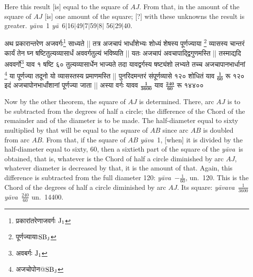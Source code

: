 \documentclass[11pt,a5paper]{book}
\def\ya{\textit{y\=a}}
\def\yava{\textit{y\=ava}}
\def\yavava{\textit{y\=avava}}
\def\danda{$|$}
\begin{document}
Here this result [is] equal to the square of $AJ$. From that, in the amount of the 
square of $AJ$ [is] one amount of the square; [?] with these unknowns the result 
is greater. \yava\ 1 \ya\ 6\danda 16\danda 49\danda 7\danda 59\danda 8\danda
56\danda 29\danda 40. 

\newpage
{\s अथ
प्रकारान्तरेण अजवर्गः\footnote{{\s प्रकारांतरेणाजवर्गः }${\rm J_1}$}
साध्यते ||
तत्र अजचापं भार्धांशेभ्यः शोध्यं शेषस्य
पूर्णज्याया \footnote{{\s पूर्णज्यायाः}${\rm SB_J}$} व्यासस्य चान्तरं कार्यं तेन घ्न षष्टितुल्यव्यासार्धं
अववर्गतुल्यं भविष्यति ||
यतः अजचापं अवचापाद्द्विगुणमस्ति ||
तस्माद्यदि अववर्गो\footnote{{\s अवबर्गः} ${\rm J_1}$}
याव १ षष्टि ६० तुल्यव्यासार्धेन भाज्यते तदा यावद्वर्गस्य
षष्ट्यंशो लभ्यते तच्च अजचापानभार्धानां \footnote{{\s अजचोपोन@}${\rm SB_J}$} या पूर्णज्या
तदूनो यो व्यासस्तस्य प्रमाणमस्ति ||
पुनरिदमन्तरं संपूर्णव्यासे १२० शोधितं
याव $\bm{\frac{\dot {1}}{60}}$ रू १२०
इदं अजचापोनभार्धांशानां पूर्णज्या जाता ||
अस्या वर्गः %
यावव $\bm{\frac{1}{3600}}$ याव $\bm{\frac{\dot{240}}{60}}$
रू १४४००}


\newpage
Now by the other theorem, the square of $AJ$ is determined. There, arc $AJ$ is to be subtracted
from the degrees of half a circle; the difference of the Chord of the remainder 
and of the diameter is to be made. The half-diameter equal to sixty multiplied by that
will be equal to the square of $AB$ since arc $AB$ is doubled from arc $AB$. 
From that, if the square of $AB$ \yava\ 1, [when] it is divided by the half-diameter equal to sixty, 60, 
then a sixtieth part of the square of the \yava\ is obtained, that is, whatever is the Chord of half a 
circle diminished by arc $AJ$, whatever diameter is decreased by that, it is the amount of that.
Again, this difference is subtracted from the full diameter 120:
\yava\ $-\frac{1}{60}$, un.\ 120. This is the Chord of the
degrees of half a circle diminished by arc $AJ$. Its square: 
\yavava\ $\frac{1}{3600}$ \yava\ $\frac{\dot{240}}{60}$ un.\ 14400.
\end{document}
